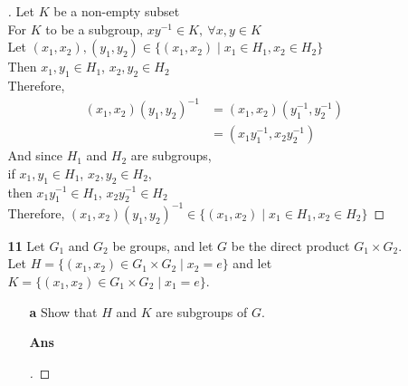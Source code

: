 \documentclass[paper=usletter, fontsize=12pt]{article}
\begin{document}
\begin{itemize}
\begin{itemize}
\begin{proof}[\unskip\nopunct]
                Let $K$ be a non-empty subset\\
                For $K$ to be a subgroup, $xy^{-1} \in K, \ \forall x,y \in K$\\
                Let $(x_1,x_2),(y_1,y_2) \in \{(x_1,x_2) \mid x_1 \in H_1, x_2 \in H_2\}$\\
                Then $x_1,y_1 \in H_1$, $x_2,y_2 \in H_2$\\
                Therefore,
                \begin{align*}
                    (x_1,x_2)(y_1,y_2)^{-1} & = (x_1,x_2)(y_1^{-1},y_2^{-1})\\
                    & = (x_1y_1^{-1},x_2y_2^{-1})
                \end{align*}
                And since $H_1$ and $H_2$ are subgroups,\\
                if $x_1,y_1 \in H_1$, $x_2,y_2 \in H_2$,\\
                then $x_1y_1^{-1} \in H_1$, $x_2y_2^{-1} \in H_2$\\
                Therefore, $(x_1,x_2)(y_1,y_2)^{-1} \in \{(x_1,x_2) \mid x_1 \in H_1, x_2 \in H_2\}$ \qedhere

            \end{proof}
            \vspace{0.2in}

            \item[\textbf{11}] Let $G_1$ and $G_2$ be groups, and let $G$ be
            the direct product $G_1 \times G_2$. Let $H=\{(x_1,x_2)\in G_1
            \times G_2 \mid x_2 = e\}$ and let $K=\{(x_1,x_2)\in G_1 \times G_2
            \mid x_1 = e\}$.

            \begin{enumerate}

                \item[\textbf{a}] Show that $H$ and $K$ are subgroups of $G$.
                \item[\textbf{Ans}]
                \begin{proof}[\unskip\nopunct]


\end{proof}
\end{enumerate}
\end{itemize}
\end{itemize}
\end{document}
